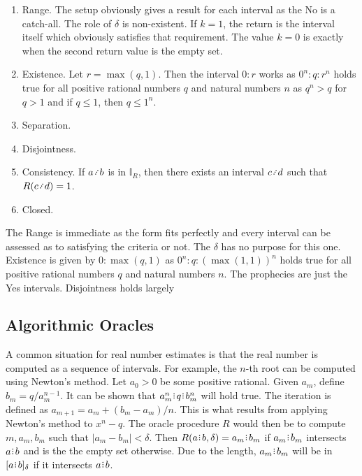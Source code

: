 \documentclass[12pt]{article}
\begin{document}
\begin{enumerate}
\item Range. The setup obviously gives a result for each interval as the No is a catch-all. The role of $\delta$ is non-existent. If $k=1$, the return is the interval itself which obviously satisfies that requirement. The value $k=0$ is exactly when the second return value is the empty set. 

\item Existence. Let $r = \max(q,1)$. Then the interval $0:r$ works  as $0^n : q : r^n$ holds true for all positive rational numbers $q$ and natural numbers $n$ as $q^n > q$ for $q > 1$ and if $q\leq 1$, then $q \leq 1^n$.

\item Separation. 

\item Disjointness.

\item Consistency. If $a \lte b$ is in $\mathbb{I}_R$, then there exists an interval $c \lte d$ such that $R(c \lte d) = 1$.  

\item Closed. 

\end{enumerate}

The Range is immediate as the form fits perfectly and every interval can be assessed as to satisfying the criteria or not. The $\delta$ has no purpose for this one. Existence is given by $0:\max(q, 1)$ as $0^n : q : (\max(1, 1))^n$ holds true for all positive rational numbers $q$ and natural numbers $n$. The prophecies are just the Yes intervals. Disjointness holds largely 


\subsection{Algorithmic Oracles}


A common situation for real number estimates is that the real number is computed as a sequence of intervals. For example, the $n$-th root can be computed using Newton's method. Let $a_0 >0$ be some positive rational. Given $a_m$, define $b_m = q/a_m^{n-1}$. It can be shown that $a_m^n \rint  q \rint  b_m^n$ will hold true. The iteration is defined as $a_{m+1} = a_m + (b_m - a_m)/n$. This is what results from applying Newton's method to $x^n - q$. The oracle procedure $R$ would then be to compute $m, a_m, b_m$ such that $|a_m - b_m| < \delta$.  Then $R(a\rint b, \delta) = a_m\rint b_m$ if $a_m\rint b_m$ intersects $a\rint b$ and is the the empty set otherwise. Due to the length, $a_m\rint b_m$ will be in $\halo{a\rint b}$ if it intersects $a\rint b$. 
\end{document}
